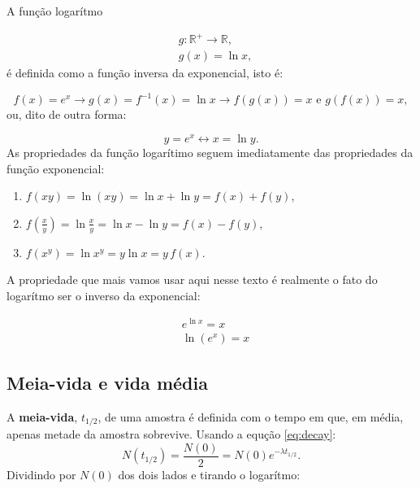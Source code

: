 \documentclass{article}
\begin{document}
A fun\c c\~ao logar\'itmo

\begin{equation}
\begin{split}
&g:\mathbb{R}^+\rightarrow \mathbb{R},\\
&g(x) = \ln x,
\end{split}
\end{equation}
 \'e definida como a fun\c c\~ao inversa da exponencial, isto \'e:

\begin{equation}
f(x) = e^x \rightarrow g(x) = f^{-1}(x) = \ln x \rightarrow f(g(x)) = x\text{ e }g(f(x)) = x,
\end{equation}
ou, dito de outra forma:

\begin{equation}
y = e^x \leftrightarrow x = \ln y.
\end{equation}
As propriedades da fun\c c\~ao logar\'itimo seguem imediatamente das propriedades da fun\c c\~ao exponencial:

\begin{enumerate}
\item $f(xy) = \ln(xy) = \ln x + \ln y = f(x) + f(y)$,
\item $f(\frac{x}{y}) = \ln\frac{x}{y} = \ln x - \ln y = f(x) - f(y)$,
\item $f(x^y) = \ln x^y = y\ln x = y\, f(x)$.
\end{enumerate}
A propriedade que mais vamos usar aqui nesse texto \'e realmente o fato do logar\'itmo ser o inverso da exponencial:

\begin{equation}
\begin{split}
&e^{\ln x} = x\\
&\ln (e^x) = x
\end{split}
\end{equation}

\subsection{Meia-vida e vida m\'edia}

A \textbf{meia-vida}, $t_{1/2}$, de uma amostra \'e definida com o tempo em que, em m\'edia, apenas metade da amostra sobrevive. Usando a equ\c c\~ao \eqref{eq:decay}:
\begin{equation}
N(t_{1/2}) = \frac{N(0)}{2} = N(0) e^{-\lambda t_{1/2}}.
\end{equation}
Dividindo por $N(0)$ dos dois lados e tirando o logar\'itmo:
\end{document}
